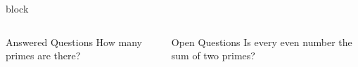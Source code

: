 \documentclass[9pt,blue,xcolor=pdftex,dvipsnames,table,handout,notes]{beamer}
\begin{document}
\begin{frame}{block}
	\begin{columns}[T]
		\begin{block}{Answered Questions}
		How many primes are there?
		\end{block}

		\begin{block}{Open Questions}
		Is every even number the sum of two primes?
		\end{block}
	\end{columns}


\end{frame}

\end{document}
